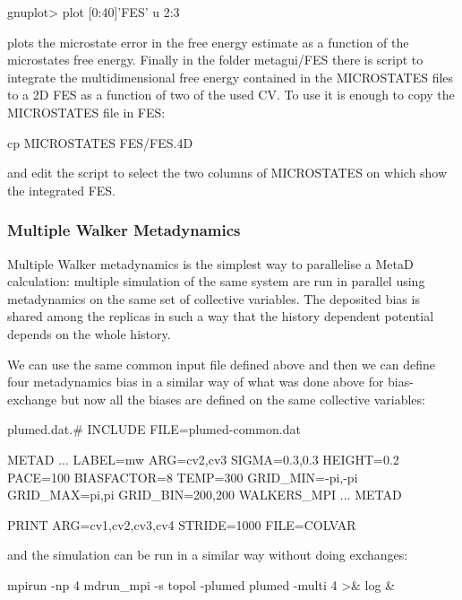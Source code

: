 \begin{DoxyVerb}gnuplot> plot [0:40]'FES' u 2:3
\end{DoxyVerb}


plots the microstate error in the free energy estimate as a function of the microstates free energy. Finally in the folder metagui/\+F\+E\+S there is script to integrate the multidimensional free energy contained in the M\+I\+C\+R\+O\+S\+T\+A\+T\+E\+S files to a 2\+D F\+E\+S as a function of two of the used C\+V. To use it is enough to copy the M\+I\+C\+R\+O\+S\+T\+A\+T\+E\+S file in F\+E\+S\+:

\begin{DoxyVerb}cp MICROSTATES FES/FES.4D
\end{DoxyVerb}


and edit the script to select the two columns of M\+I\+C\+R\+O\+S\+T\+A\+T\+E\+S on which show the integrated F\+E\+S.\hypertarget{belfast-8_mw}{}\subsubsection{Multiple Walker Metadynamics}\label{belfast-8_mw}
Multiple Walker metadynamics is the simplest way to parallelise a Meta\+D calculation\+: multiple simulation of the same system are run in parallel using metadynamics on the same set of collective variables. The deposited bias is shared among the replicas in such a way that the history dependent potential depends on the whole history.

We can use the same common input file defined above and then we can define four metadynamics bias in a similar way of what was done above for bias-\/exchange but now all the biases are defined on the same collective variables\+:

\begin{DoxyVerb}plumed.dat.#
INCLUDE FILE=plumed-common.dat

METAD ...
LABEL=mw 
ARG=cv2,cv3 
SIGMA=0.3,0.3 
HEIGHT=0.2 
PACE=100
BIASFACTOR=8
TEMP=300 
GRID_MIN=-pi,-pi 
GRID_MAX=pi,pi 
GRID_BIN=200,200
WALKERS_MPI
... METAD

PRINT ARG=cv1,cv2,cv3,cv4 STRIDE=1000 FILE=COLVAR
\end{DoxyVerb}


and the simulation can be run in a similar way without doing exchanges\+:

\begin{DoxyVerb}mpirun -np 4 mdrun_mpi -s topol -plumed plumed -multi 4  >& log &
\end{DoxyVerb}


